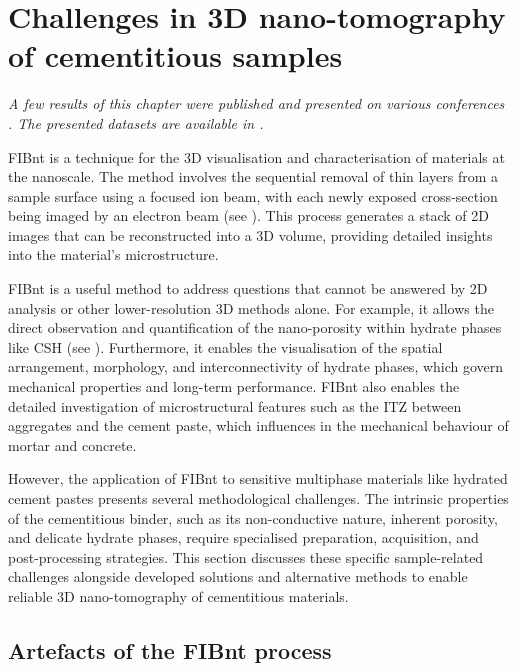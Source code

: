 \FloatBarrier
\newpage
\section{Challenges in 3D nano-tomography of cementitious samples}

\textit{A few results of this chapter were published and presented on various conferences \cite{kleiner.2021b,kleiner.2021c,kleiner.2025f}. The presented datasets are available in \cite{kleiner.2026c}.}

\Ac{FIBnt} is a technique for the 3D visualisation and characterisation of materials at the nanoscale.
The method involves the sequential removal of thin layers from a sample surface using a focused ion beam, with each newly exposed cross-section being imaged by an electron beam (see ).
This process generates a stack of 2D images that can be reconstructed into a 3D volume, providing detailed insights into the material's microstructure.

\ac{FIBnt} is a useful method to address questions that cannot be answered by 2D analysis or other lower-resolution 3D methods alone.
For example, it allows the direct observation and quantification of the nano-porosity within hydrate phases like \ac{CSH} (see ).
Furthermore, it enables the visualisation of the spatial arrangement, morphology, and interconnectivity of hydrate phases, which govern mechanical properties and long-term performance.
\Ac{FIBnt} also enables the detailed investigation of microstructural features such as the \ac{ITZ} between aggregates and the cement paste, which influences in the mechanical behaviour of mortar and concrete.

However, the application of \ac{FIBnt} to sensitive multiphase materials like hydrated cement pastes presents several methodological challenges.
The intrinsic properties of the cementitious binder, such as its non-conductive nature, inherent porosity, and delicate hydrate phases, require specialised preparation, acquisition, and post-processing strategies.
This section discusses these specific sample-related challenges alongside developed solutions and alternative methods to enable reliable 3D nano-tomography of cementitious materials.

\subsection{Artefacts of the \acs*{FIBnt} process}

